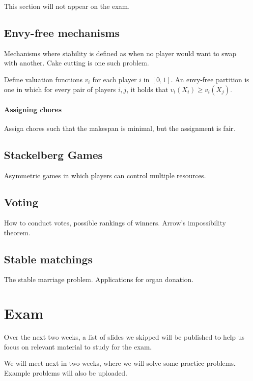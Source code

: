 \documentclass{idc_msc}
\begin{document}
This section will not appear on the exam.

\subsection{Envy-free mechanisms}

Mechanisms where stability is defined as when no player would want to swap with another.
Cake cutting is one such problem.

Define valuation functions \(v_i\) for each player \(i\) in \([0,1]\).
An envy-free partition is one in which for every pair of players \(i, j\), it holds that \(v_i(X_i) \ge v_i(X_j)\).

\paragraph{Assigning chores}

Assign chores such that the makespan is minimal, but the assignment is fair.

\subsection{Stackelberg Games}

Asymmetric games in which players can control multiple resources.

\subsection{Voting}

How to conduct votes, possible rankings of winners.
Arrow's impossibility theorem.

\subsection{Stable matchings}

The stable marriage problem.
Applications for organ donation.

\section{Exam}

Over the next two weeks, a list of slides we skipped will be published to help us focus on relevant material to study for the exam.

We will meet next in two weeks, where we will solve some practice problems.
Example problems will also be uploaded.
\end{document}
